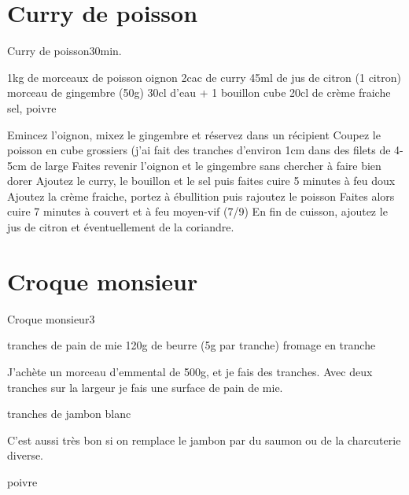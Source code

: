{\section{Curry de poisson}
\begin{recette}{Curry de poisson}{}{30min.}{}
\begin{ingredients}
\ingredient 1kg de morceaux de poisson
 oignon
\ingredient 2cac de curry
\ingredient 45ml de jus de citron (1 citron)
 morceau de gingembre (50g)
\ingredient 30cl d'eau + 1 bouillon cube
\ingredient 20cl de crème fraiche
\ingredient sel, poivre
\end{ingredients}

\begin{preparation}
\etape Emincez l'oignon, mixez le gingembre et réservez dans un récipient
\etape Coupez le poisson en cube grossiers (j'ai fait des tranches d'environ 1cm dans des filets de 4-5cm de large
\etape Faites revenir l'oignon et le gingembre sans chercher à faire bien dorer
\etape Ajoutez le curry, le bouillon et le sel puis faites cuire 5 minutes à feu doux
\etape Ajoutez la crème fraiche, portez à ébullition puis rajoutez le poisson
\etape Faites alors cuire 7 minutes à couvert et à feu moyen-vif (7/9)
\etape En fin de cuisson, ajoutez le jus de citron et éventuellement de la coriandre. 
\end{preparation}
\end{recette}

\section{Croque monsieur}
\begin{recette}{Croque monsieur}{3}{}{}
\begin{ingredients}
 tranches de pain de mie
\ingredient 120g de beurre (5g par tranche)
\ingredient fromage en tranche
\begin{remarque}
J'achète un morceau d'emmental de 500g, et je fais des tranches. Avec deux tranches sur la largeur je fais une surface de pain 
de mie.
\end{remarque}

 tranches de jambon blanc
\begin{remarque}
C'est aussi très bon si on remplace le jambon par du saumon ou de la charcuterie diverse.
\end{remarque}

\ingredient poivre
\end{ingredients}


\end{recette}}
